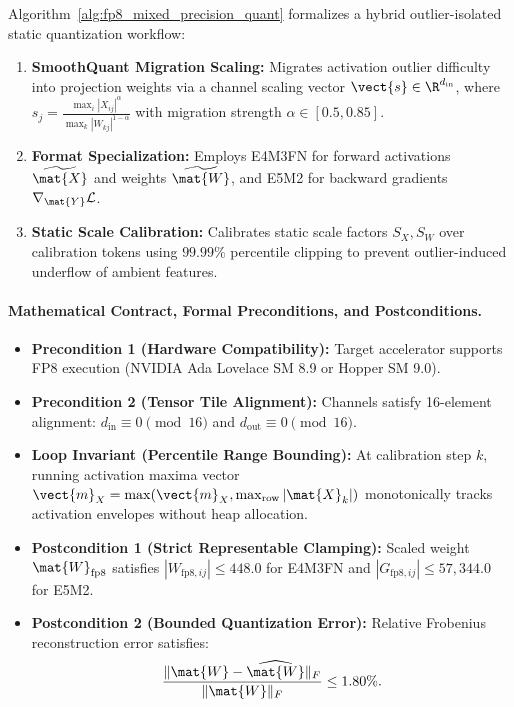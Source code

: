 Algorithm~\ref{alg:fp8_mixed_precision_quant} formalizes a hybrid outlier-isolated static quantization workflow:
\begin{enumerate}
    \item \textbf{SmoothQuant Migration Scaling:} Migrates activation outlier difficulty into projection weights via a channel scaling vector $\vect{s} \in \R^{d_{\text{in}}}$, where $s_j = \frac{\max_i |X_{ij}|^\alpha}{\max_k |W_{kj}|^{1-\alpha}}$ with migration strength $\alpha \in [0.5, 0.85]$.
    \item \textbf{Format Specialization:} Employs E4M3FN for forward activations $\widetilde{\mat{X}}$ and weights $\widetilde{\mat{W}}$, and E5M2 for backward gradients $\nabla_{\mat{Y}}\mathcal{L}$.
    \item \textbf{Static Scale Calibration:} Calibrates static scale factors $S_X, S_W$ over calibration tokens using $99.99\%$ percentile clipping to prevent outlier-induced underflow of ambient features.
\end{enumerate}

\paragraph{Mathematical Contract, Formal Preconditions, and Postconditions.}
\begin{itemize}
    \item \textbf{Precondition 1 (Hardware Compatibility):} Target accelerator supports FP8 execution (NVIDIA Ada Lovelace SM 8.9 or Hopper SM 9.0).
    \item \textbf{Precondition 2 (Tensor Tile Alignment):} Channels satisfy 16-element alignment: $d_{\text{in}} \equiv 0 \pmod{16}$ and $d_{\text{out}} \equiv 0 \pmod{16}$.
    \item \textbf{Loop Invariant (Percentile Range Bounding):} At calibration step $k$, running activation maxima vector $\vect{m}_X = \max(\vect{m}_X, \max_{\text{row}} |\mat{X}_k|)$ monotonically tracks activation envelopes without heap allocation.
    \item \textbf{Postcondition 1 (Strict Representable Clamping):} Scaled weight $\mat{W}_{\text{fp8}}$ satisfies $|W_{\text{fp8}, ij}| \le 448.0$ for E4M3FN and $|G_{\text{fp8}, ij}| \le 57{,}344.0$ for E5M2.
    \item \textbf{Postcondition 2 (Bounded Quantization Error):} Relative Frobenius reconstruction error satisfies:
    \begin{equation}
        \frac{\|\mat{W} - \widehat{\mat{W}}\|_F}{\|\mat{W}\|_F} \le 1.80\%.
    \end{equation}
\end{itemize}

